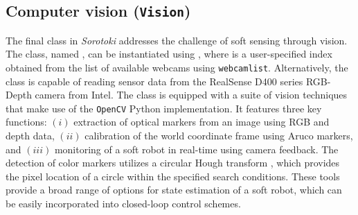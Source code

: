 \subsection{Computer vision (\texttt{Vision})}
\label{sec:C5:vision}
The final class in \textit{Sorotoki} addresses the challenge of soft sensing through vision. The class, named , can be instantiated using , where  is a user-specified index obtained from the list of available webcams using \texttt{webcamlist}. Alternatively, the  class is capable of reading sensor data from the RealSense D400 series RGB-Depth camera from Intel. The class is equipped with a suite of vision techniques that make use of the \texttt{OpenCV} Python implementation. It features three key functions: $(i)$ extraction of optical markers from an image using RGB and depth data, $(ii)$ calibration of the world coordinate frame using Aruco markers, and $(iii)$ monitoring of a soft robot in real-time using camera feedback. The detection of color markers utilizes a circular Hough transform \cite{Illingworth1987Sep}, which provides the pixel location of a circle within the specified search conditions. These tools provide a broad range of options for state estimation of a soft robot, which can be easily incorporated into closed-loop control schemes.

